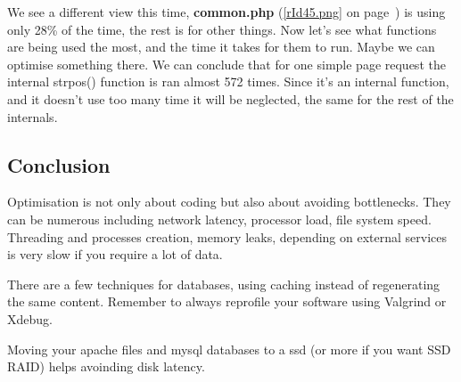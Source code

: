 \newpage

\begin{comment}
	

\begin{wrapfigure}{r}{0.7\textwidth}
  \vspace{-20pt}
  \begin{center}
 \texttt{[image: rId45.png]}
  \end{center}
  \vspace{0pt}
	\caption{Functions usage in KCacheGrind\label{rId45.png}}
\end{wrapfigure}
\end{comment}
We see a different view this time, \textbf{common.php} (\autoref{rId45.png} on page~\pageref{rId45.png}) is using only 28\% of the time, the rest is for other things. Now let's see what functions are being used the most, and the time it takes for them to run. Maybe we can optimise something there. We can conclude that for one simple page request the internal strpos() function is ran almost 572 times. Since it's an internal function, and it doesn't use too many time it will be neglected, the same for the rest of the internals.

\subsection{Conclusion}
Optimisation is not only about coding but also about avoiding bottlenecks. They can be numerous including network latency, processor load, file system speed.
Threading and processes creation, memory leaks, depending on external services is very slow if you require a lot of data.

There are a few techniques for databases, using caching instead of regenerating the same content. 
Remember to always reprofile your software using Valgrind or Xdebug.

Moving your \gls{apache} files and \gls{mysql} databases to a \gls{ssd} (or more if you want SSD RAID) helps avoinding disk latency.
